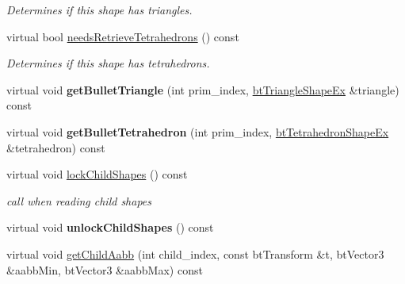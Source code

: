\begin{DoxyCompactItemize}
\begin{DoxyCompactList}\small\item\em Determines if this shape has triangles. \end{DoxyCompactList}\item 
\hypertarget{classbt_g_impact_mesh_shape_a732b818ef16f33c57f0fe13dcfe2e1a3}{virtual bool \hyperlink{classbt_g_impact_mesh_shape_a732b818ef16f33c57f0fe13dcfe2e1a3}{needs\+Retrieve\+Tetrahedrons} () const }\label{classbt_g_impact_mesh_shape_a732b818ef16f33c57f0fe13dcfe2e1a3}

\begin{DoxyCompactList}\small\item\em Determines if this shape has tetrahedrons. \end{DoxyCompactList}\item 
\hypertarget{classbt_g_impact_mesh_shape_a1f0cc1518a14a9b5443889bc036ed2a5}{virtual void {\bfseries get\+Bullet\+Triangle} (int prim\+\_\+index, \hyperlink{classbt_triangle_shape_ex}{bt\+Triangle\+Shape\+Ex} \&triangle) const }\label{classbt_g_impact_mesh_shape_a1f0cc1518a14a9b5443889bc036ed2a5}

\item 
\hypertarget{classbt_g_impact_mesh_shape_a44911f94b3b0feebe80d6d3871daa98e}{virtual void {\bfseries get\+Bullet\+Tetrahedron} (int prim\+\_\+index, \hyperlink{classbt_tetrahedron_shape_ex}{bt\+Tetrahedron\+Shape\+Ex} \&tetrahedron) const }\label{classbt_g_impact_mesh_shape_a44911f94b3b0feebe80d6d3871daa98e}

\item 
\hypertarget{classbt_g_impact_mesh_shape_a569599b4c909a948c3489ca351ce3b89}{virtual void \hyperlink{classbt_g_impact_mesh_shape_a569599b4c909a948c3489ca351ce3b89}{lock\+Child\+Shapes} () const }\label{classbt_g_impact_mesh_shape_a569599b4c909a948c3489ca351ce3b89}

\begin{DoxyCompactList}\small\item\em call when reading child shapes \end{DoxyCompactList}\item 
\hypertarget{classbt_g_impact_mesh_shape_ac67f278f835b438ef39ee69f5a4f9d00}{virtual void {\bfseries unlock\+Child\+Shapes} () const }\label{classbt_g_impact_mesh_shape_ac67f278f835b438ef39ee69f5a4f9d00}

\item 
\hypertarget{classbt_g_impact_mesh_shape_a92be12fb67279fcb6f8bf47c9d6608a9}{virtual void \hyperlink{classbt_g_impact_mesh_shape_a92be12fb67279fcb6f8bf47c9d6608a9}{get\+Child\+Aabb} (int child\+\_\+index, const bt\+Transform \&t, bt\+Vector3 \&aabb\+Min, bt\+Vector3 \&aabb\+Max) const }\label{classbt_g_impact_mesh_shape_a92be12fb67279fcb6f8bf47c9d6608a9}


\end{DoxyCompactItemize}
